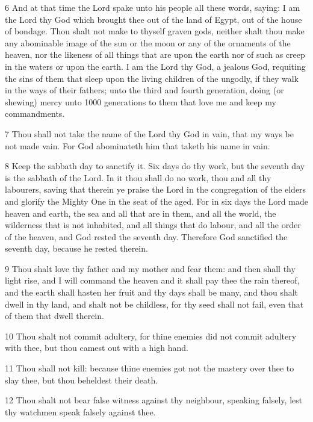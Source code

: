 \par 6 And at that time the Lord spake unto his people all these words, saying: I am the Lord thy God which brought thee out of the land of Egypt, out of the house of bondage. Thou shalt not make to thyself graven gods, neither shalt thou make any abominable image of the sun or the moon or any of the ornaments of the heaven, nor the likeness of all things that are upon the earth nor of such as creep in the waters or upon the earth. I am the Lord thy God, a jealous God, requiting the sins of them that sleep upon the living children of the ungodly, if they walk in the ways of their fathers; unto the third and fourth generation, doing (or shewing) mercy unto 1000 generations to them that love me and keep my commandments.

\par 7 Thou shall not take the name of the Lord thy God in vain, that my ways be not made vain. For God abominateth him that taketh his name in vain.

\par 8 Keep the sabbath day to sanctify it. Six days do thy work, but the seventh day is the sabbath of the Lord. In it thou shall do no work, thou and all thy labourers, saving that therein ye praise the Lord in the congregation of the elders and glorify the Mighty One in the seat of the aged. For in six days the Lord made heaven and earth, the sea and all that are in them, and all the world, the wilderness that is not inhabited, and all things that do labour, and all the order of the heaven, and God rested the seventh day. Therefore God sanctified the seventh day, because he rested therein.

\par 9 Thou shalt love thy father and my mother and fear them: and then shall thy light rise, and I will command the heaven and it shall pay thee the rain thereof, and the earth shall hasten her fruit and thy days shall be many, and thou shalt dwell in thy land, and shalt not be childless, for thy seed shall not fail, even that of them that dwell therein.

\par 10 Thou shalt not commit adultery, for thine enemies did not commit adultery with thee, but thou camest out with a high hand.

\par 11 Thou shall not kill: because thine enemies got not the mastery over thee to slay thee, but thou beheldest their death.

\par 12 Thou shalt not bear false witness against thy neighbour, speaking falsely, lest thy watchmen speak falsely against thee.


